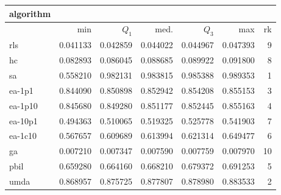 \begin{tabular}{@{}l*{5}{>{{}}N{1}{3}}>{{}}N{2}{0}@{}}
\toprule
{algorithm} &  \\
\midrule
& {min} & {$Q_1$} & {med.} & {$Q_3$} & {max} & {rk}\\
\midrule
rls & 0.041133 & 0.042859 & 0.044022 & 0.044967 & 0.047393 & 9\\
hc & 0.082893 & 0.086045 & 0.088685 & 0.089922 & 0.091800 & 8\\
sa & 0.558210 & {\color{blue}} 0.982131 & {\color{blue}} 0.983815 & {\color{blue}} 0.985388 & {\color{blue}} 0.989353 & 1\\
ea-1p1 & 0.844090 & 0.850898 & 0.852942 & 0.854208 & 0.855153 & 3\\
ea-1p10 & 0.845680 & 0.849280 & 0.851177 & 0.852445 & 0.855163 & 4\\
ea-10p1 & 0.494363 & 0.510065 & 0.519325 & 0.525778 & 0.541903 & 7\\
ea-1c10 & 0.567657 & 0.609689 & 0.613994 & 0.621314 & 0.649477 & 6\\
ga & 0.007210 & 0.007347 & 0.007590 & 0.007759 & 0.007970 & 10\\
pbil & 0.659280 & 0.664160 & 0.668210 & 0.679372 & 0.691253 & 5\\
umda & {\color{blue}} 0.868957 & 0.875725 & 0.877807 & 0.878980 & 0.883533 & 2\\
\bottomrule
\end{tabular}
